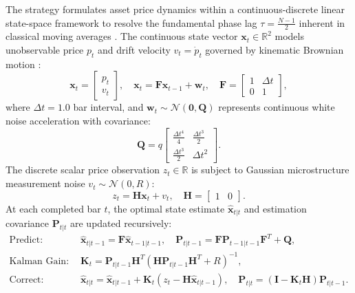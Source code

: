 \documentclass[11pt,a4paper]{article}
\begin{document}
The strategy formulates asset price dynamics within a continuous-discrete linear state-space framework to resolve the fundamental phase lag $\tau = \frac{N-1}{2}$ inherent in classical moving averages \cite{kalman1960new, harvey1990forecasting}.
The continuous state vector $\mathbf{x}_t \in \mathbb{R}^2$ models unobservable price $p_t$ and drift velocity $v_t = \dot{p}_t$ governed by kinematic Brownian motion \cite{hamilton1994time, durbin2012time}:
\begin{equation}
\mathbf{x}_t = \begin{bmatrix} p_t \\ v_t \end{bmatrix}, \quad \mathbf{x}_t = \mathbf{F} \mathbf{x}_{t-1} + \mathbf{w}_t, \quad \mathbf{F} = \begin{bmatrix} 1 & \Delta t \\ 0 & 1 \end{bmatrix},
\end{equation}
where $\Delta t = 1.0$ bar interval, and $\mathbf{w}_t \sim \mathcal{N}(\mathbf{0}, \mathbf{Q})$ represents continuous white noise acceleration with covariance:
\begin{equation}
\mathbf{Q} = q \begin{bmatrix} \frac{\Delta t^4}{4} & \frac{\Delta t^3}{2} \\ \frac{\Delta t^3}{2} & \Delta t^2 \end{bmatrix}.
\end{equation}
The discrete scalar price observation $z_t \in \mathbb{R}$ is subject to Gaussian microstructure measurement noise $v_t \sim \mathcal{N}(0, R)$:
\begin{equation}
z_t = \mathbf{H} \mathbf{x}_t + v_t, \quad \mathbf{H} = \begin{bmatrix} 1 & 0 \end{bmatrix}.
\end{equation}
At each completed bar $t$, the optimal state estimate $\hat{\mathbf{x}}_{t|t}$ and estimation covariance $\mathbf{P}_{t|t}$ are updated recursively:
\begin{align}
\text{Predict:} \quad & \hat{\mathbf{x}}_{t|t-1} = \mathbf{F}\hat{\mathbf{x}}_{t-1|t-1}, \quad \mathbf{P}_{t|t-1} = \mathbf{F}\mathbf{P}_{t-1|t-1}\mathbf{F}^T + \mathbf{Q}, \\
\text{Kalman Gain:} \quad & \mathbf{K}_t = \mathbf{P}_{t|t-1}\mathbf{H}^T \left(\mathbf{H}\mathbf{P}_{t|t-1}\mathbf{H}^T + R\right)^{-1}, \\
\text{Correct:} \quad & \hat{\mathbf{x}}_{t|t} = \hat{\mathbf{x}}_{t|t-1} + \mathbf{K}_t \left(z_t - \mathbf{H}\hat{\mathbf{x}}_{t|t-1}\right), \quad \mathbf{P}_{t|t} = (\mathbf{I} - \mathbf{K}_t\mathbf{H})\mathbf{P}_{t|t-1}.
\end{align}
\end{document}
